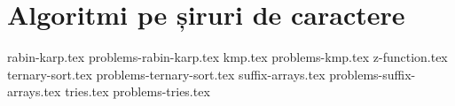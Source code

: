 \part{Algoritmi pe șiruri de caractere}

{rabin-karp.tex}
{problems-rabin-karp.tex}
{kmp.tex}
{problems-kmp.tex}
{z-function.tex}
{ternary-sort.tex}
{problems-ternary-sort.tex}
{suffix-arrays.tex}
{problems-suffix-arrays.tex}
{tries.tex}
{problems-tries.tex}

